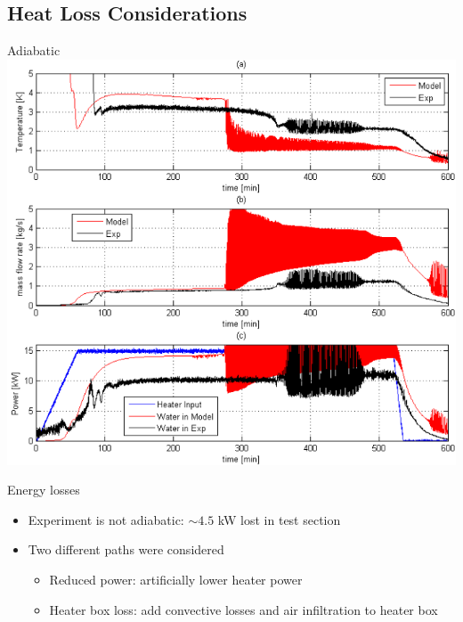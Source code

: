 \documentclass[10pt,t,xcolor=table]{UWMadBeamer}
\begin{document}
\subsection{Heat Loss Considerations}

\begin{frame}{Adiabatic}
    \centering
    \includegraphics[height=0.77\paperheight]{Comparison_Adiabatic}
\end{frame}
\begin{frame}{Energy losses}
    \begin{itemize}
        \item Experiment is not adiabatic: $\sim4.5$ kW lost in test section
        \item Two different paths were considered
        \begin{itemize}
            \item Reduced power: artificially lower heater power
            \item Heater box loss: add convective losses and air infiltration to heater box
        \end{itemize}
    \end{itemize}
\end{frame}
\end{document}
